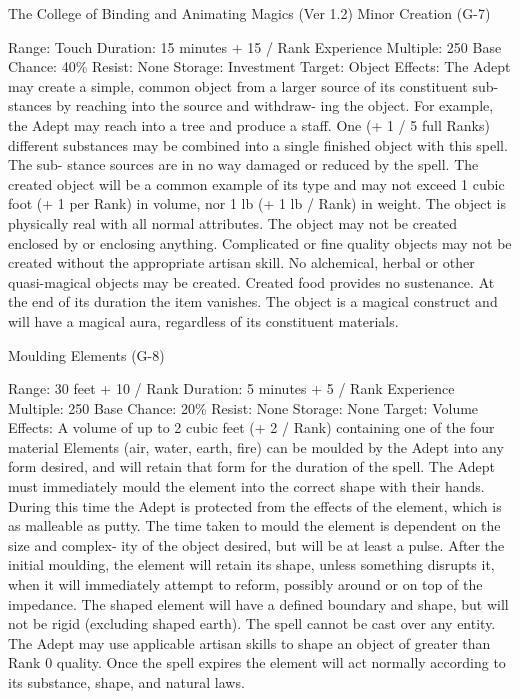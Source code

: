 \begin{Chapter}{The College of Binding and Animating Magics (Ver 1.2)}
Minor Creation (G-7) 

Range: Touch 
Duration: 15 minutes + 15 / Rank 
Experience Multiple: 250 
Base Chance: 40\% 
Resist: None 
Storage: Investment 
Target: Object 
Effects:  The  Adept  may  create  a  simple,  common 
object  from  a  larger  source  of  its  constituent  sub-
stances  by  reaching  into the  source  and  withdraw-
ing  the  object.  For  example,  the  Adept  may  reach 
into  a  tree  and  produce  a  staff.  One  (+  1  /  5  full 
Ranks) different substances may be combined into 
a  single  finished  object  with  this  spell.  The  sub-
stance  sources  are  in  no  way  damaged  or  reduced 
by the spell.  The created object will  be a common 
example  of  its  type  and  may  not  exceed  1  cubic 
foot  (+  1  per  Rank)  in  volume,  nor  1  lb  (+  1  lb  / 
Rank) in weight. The object is physically real with 
all normal attributes. The object may not be created 
enclosed by or enclosing anything. Complicated or 
fine quality objects may not be created without the 
appropriate  artisan  skill.  No  alchemical,  herbal  or 
other  quasi-magical  objects  may  be  created.  Created food provides no sustenance. At the end of its 
duration the item vanishes. The object is a magical 
construct  and  will  have  a  magical  aura,  regardless 
of its constituent materials. 

Moulding Elements (G-8) 

Range: 30 feet + 10 / Rank 
Duration: 5 minutes + 5 / Rank 
Experience Multiple: 250 
Base Chance: 20\% 
Resist: None 
Storage: None 
Target: Volume 
Effects:  A  volume  of  up  to  2  cubic  feet  (+  2  / 
Rank) containing one of the four material Elements 
(air,  water,  earth,  fire)  can  be  moulded  by  the 
Adept  into  any  form  desired,  and  will  retain  that 
form for the duration of the spell. The Adept must 
immediately  mould  the  element  into  the  correct 
shape with their hands. During this time the Adept 
is protected from the effects of the element, which 
is  as  malleable  as  putty.  The  time  taken  to  mould 
the element is dependent on the size and complex-
ity of the object desired, but will be at least a pulse. 
After  the  initial  moulding,  the  element  will  retain 
its shape, unless something disrupts it, when it will 
immediately attempt to reform, possibly around  or 
on  top  of  the impedance.  The  shaped  element  will 
have a defined boundary and shape, but will not be 
rigid (excluding shaped earth). The spell cannot be 
cast over any entity. The Adept may use applicable 
artisan  skills  to  shape  an  object  of  greater  than 
Rank 0 quality. Once the spell expires the element 
will act normally according to its substance, shape, 
and natural laws. 



\end{Chapter}
